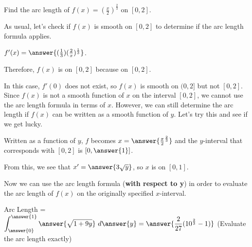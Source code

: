 \documentclass[handout,nooutcomes]{ximera}
\begin{document}
\begin{problem}
Find the arc length of $f(x) = \left(\frac{x}{2}\right)^{\frac{2}{3}}$ on $[0,2]$.  

As usual, let's check if $f(x)$ is smooth on $[0,2]$ to determine if the arc length formula applies.

$f'(x) = \answer{(\frac{1}{3})(\frac{2}{x})^{\frac{1}{3}}}$.  

Therefore, $f(x)$ is  on $[0,2]$ because  on $[0,2]$.  

\begin{problem}
In this case, $f'(0)$ does not exist, so $f(x)$ is smooth on $(0,2]$ but not $[0,2]$.  Since $f(x)$ is not a smooth function of $x$ on the interval $[0,2]$, we cannot use the arc length formula in terms of $x$.  However, we can still determine the arc length if $f(x)$ can be written as a smooth function of $y$.  Let's try this and see if we get lucky.  

Written as a function of $y$, $f$ becomes $x = \answer{\frac{x}{2}^{\frac{2}{3}}}$ and the $y$-interval that corresponds with $[0,2]$ is $[0, \answer{1}]$.  

\begin{problem}
From this, we see that $x' = \answer{3\sqrt{y}}$, so $x$ is  on $[0,1]$.  

\begin{problem}
Now we can use the arc length formula (\textbf{with respect to y}) in order to evaluate the arc length of $f(x)$ on the originally specified $x$-interval. 

Arc Length = $\displaystyle\int_{\answer{0}}^{\answer{1}} \answer{\sqrt{1+9y}} \ d\answer{y} = \answer{\frac{2}{27}(10^{\frac{2}{3}}-1)}$ (Evaluate the arc length exactly)

\end{problem}
\end{problem}
\end{problem}
\end{problem}

\end{document}
